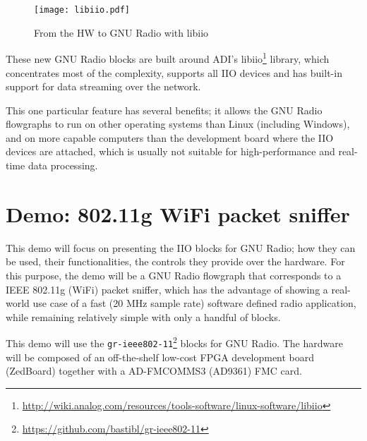 \documentclass{sig-alternate-2013}
\begin{document}
\begin{figure}[htbp]
\centering
\texttt{[image: libiio.pdf]}
\caption{From the HW to GNU Radio with libiio}
\end{figure}

These new GNU Radio blocks are built around ADI's
libiio\footnote{\url{http://wiki.analog.com/resources/tools-software/linux-software/libiio}}
library, which concentrates most of the complexity,
supports all IIO devices and has built-in support
for data streaming over the network.

This one particular feature
has several benefits; it allows the GNU Radio flowgraphs to run
on other operating systems than Linux (including Windows),
and on more capable computers than the development board
where the IIO devices are attached, which is usually not
suitable for high-performance and real-time data processing.

\section{Demo: 802.11g WiFi packet sniffer}

This demo will focus on presenting the IIO blocks for GNU Radio; how they can be
used, their functionalities, the controls they provide over the hardware.
For this purpose, the demo will be a GNU Radio flowgraph that corresponds to a
IEEE 802.11g (WiFi) packet sniffer, which has the advantage of showing a
real-world use case of a fast (20 MHz sample rate) software defined radio
application, while remaining relatively simple with only a handful of blocks.

This demo will use the
\texttt{gr-ieee802-11}\footnote{\url{https://github.com/bastibl/gr-ieee802-11}}
blocks for GNU Radio. The hardware will be composed of an off-the-shelf low-cost
FPGA development board (ZedBoard) together with a AD-FMCOMMS3 (AD9361) FMC card.

\balancecolumns
\end{document}

